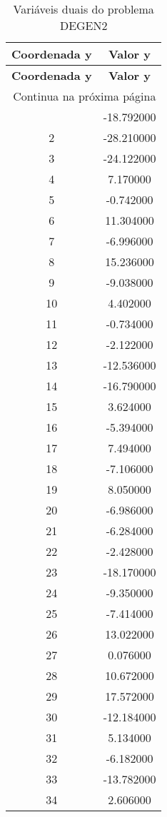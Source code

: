 \documentclass[12pt]{article}
\begin{document}
\begin{longtable}{@{}cc@{}}
\caption{Variáveis duais do problema DEGEN2} \\
\toprule
\textbf{Coordenada y} & \textbf{Valor y} \\
\midrule
\endfirsthead

\toprule
\textbf{Coordenada y} & \textbf{Valor y} \\
\midrule
\endhead

\midrule \multicolumn{2}{r}{{Continua na próxima página}} \\ \midrule
\endfoot

\bottomrule
\endlastfoot
1 & -18.792000 \\
2 & -28.210000 \\
3 & -24.122000 \\
4 & 7.170000 \\
5 & -0.742000 \\
6 & 11.304000 \\
7 & -6.996000 \\
8 & 15.236000 \\
9 & -9.038000 \\
10 & 4.402000 \\
11 & -0.734000 \\
12 & -2.122000 \\
13 & -12.536000 \\
14 & -16.790000 \\
15 & 3.624000 \\
16 & -5.394000 \\
17 & 7.494000 \\
18 & -7.106000 \\
19 & 8.050000 \\
20 & -6.986000 \\
21 & -6.284000 \\
22 & -2.428000 \\
23 & -18.170000 \\
24 & -9.350000 \\
25 & -7.414000 \\
26 & 13.022000 \\
27 & 0.076000 \\
28 & 10.672000 \\
29 & 17.572000 \\
30 & -12.184000 \\
31 & 5.134000 \\
32 & -6.182000 \\
33 & -13.782000 \\
34 & 2.606000 \\

\end{longtable}
\end{document}
